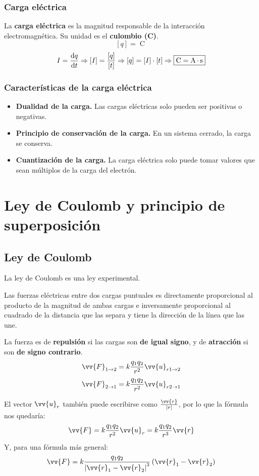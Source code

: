 \documentclass[a4paper]{book}
\numberwithin{figure}{chapter}
\numberwithin{equation}{chapter}
\newcommand{\s}{\operatorname{s}}
\newcommand{\A}{\operatorname{A}}
\newcommand{\C}{\operatorname{C}}
\renewcommand{\vec}[1]{\vv{{#1}}}
\begin{document}
\subsubsection{Carga eléctrica}
La \textbf{carga eléctrica} es la magnitud responsable de la interacción electromagnética. Su unidad es el \textbf{culombio (C)}.
\[[q] = \C \]
\[I = \dv{q}{t} \Rightarrow [I] = \frac{[q]}{[t]}\Rightarrow [q] = [I]\cdot [t] \Rightarrow \boxed{\C = \A \cdot \s}\]

\subsubsection{Características de la carga eléctrica}
\vspace{1.5\parskip}
\begin{itemize}
	\item \textbf{Dualidad de la carga.} Las cargas eléctricas solo pueden ser positivas o negativas.
	\item \textbf{Principio de conservación de la carga.} En un sistema cerrado, la carga se conserva.
	\item \textbf{Cuantización de la carga.} La carga eléctrica solo puede tomar valores que sean múltiplos de la carga del electrón.
\end{itemize}

\section{Ley de Coulomb y principio de superposición}
\subsection{Ley de Coulomb}
La ley de Coulomb es una ley experimental.

Las fuerzas eléctricas entre dos cargas puntuales es directamente proporcional al producto de la magnitud de ambas cargas e inversamente proporcional al cuadrado de la distancia que las separa y tiene la dirección de la línea que las une.

La fuerza es de \textbf{repulsión} si las cargas son \textbf{de igual signo}, y de \textbf{atracción} si son \textbf{de signo contrario}.
\[\vec{F}_{1\to 2} = k\frac{q_1q_2}{r^2}\vec{u}_{r1\to 2}\]
\[\vec{F}_{2\to 1} = k\frac{q_1q_2}{r^2}\vec{u}_{r2\to 1}\]

El vector $ \vec{u}_r $ también puede escribirse como $ \frac{\vec{r}}{\abs{r}} $, por lo que la fórmula nos quedaría:
\[\vec{F} = k\frac{q_1q_2}{r^2}\vec{u}_r = k\frac{q_1q_2}{r^3}\vec{r}\]
Y, para una fórmula más general:
\[\vec{F}=k\frac{q_1q_2}{\abs{\vec{r}_1 - \vec{r}_2}^3}\left( \vec{r}_1 - \vec{r}_2 \right)\]
\end{document}
